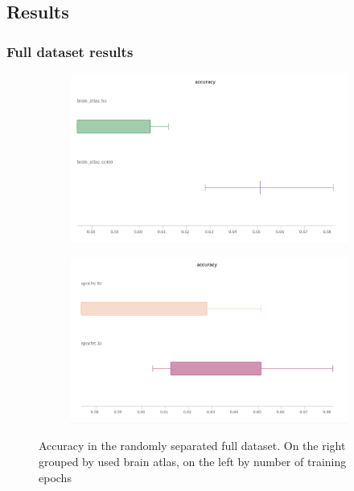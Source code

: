 	\subsection{Results}
	
	
	\subsubsection{Full dataset results}
	
	\begin{figure}[!h]
		\centering
		\begin{subfigure}[b]{0.45\textwidth}
			\centering
			\includegraphics[width=\textwidth]{figures/all_atlas.png}
		\end{subfigure}
		\hfill
		\begin{subfigure}[b]{0.45\textwidth}
			\centering
			\includegraphics[width=\textwidth]{figures/all_epochs.png}
		\end{subfigure}
		\caption{Accuracy in the randomly separated full dataset. On the right grouped by used brain atlas, on the left by number of training epochs}
		\label{fig:full_dataset}
	\end{figure}
	

